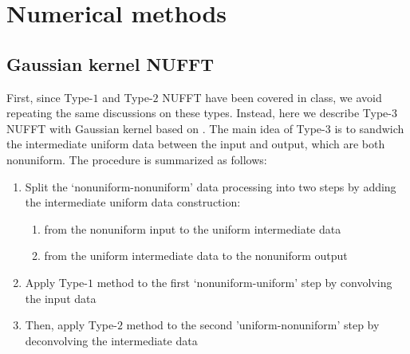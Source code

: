 \section{Numerical methods}

\subsection{Gaussian kernel NUFFT}

First, since Type-$1$ and Type-$2$ NUFFT have been covered in class, we avoid repeating the same discussions on these types.
Instead, here we describe Type-$3$ NUFFT with Gaussian kernel based on \cite{JCP-2003-Greengard}.
The main idea of Type-$3$ is to sandwich the intermediate uniform data between the input and output, which are both nonuniform.
The procedure is summarized as follows:
\begin{enumerate}
  \item Split the `nonuniform-nonuniform' data processing into two steps
  by adding the intermediate uniform data construction:
  \begin{enumerate}
    \item from the nonuniform input to the uniform intermediate data
    \item from the uniform intermediate data to the nonuniform output
  \end{enumerate}
  \item Apply Type-$1$ method to the first `nonuniform-uniform' step by convolving the input data
  \item Then, apply Type-$2$ method to the second 'uniform-nonuniform' step by deconvolving the intermediate data
\end{enumerate}

